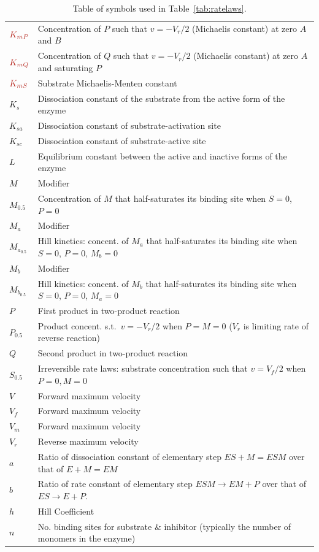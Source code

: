\documentclass[10pt]{cekarticle}
\newcommand{\changed}[1]{\textcolor{BrickRed}{#1}}
\begin{document}
\begin{table}[ht]
\begin{tabular}{lp{5.5in}}
    $\changed{K_{mP}}$	& Concentration of $P$ such that $v = -V_r/2$  (Michaelis constant) at zero $A$ and $B$ \\
    $\changed{K_{mQ}}$	& Concentration of $Q$ such that $v = -V_r/2$  (Michaelis constant) at zero $A$ and saturating $P$ \\
    $\changed{K_{mS}}$	& Substrate Michaelis-Menten constant \\
    $K_s$	& Dissociation constant of the substrate from the active form of the enzyme \\
    $K_{sa}$	& Dissociation constant of substrate-activation site \\
    $K_{sc}$	& Dissociation constant of substrate-active site \\
    $L$		& Equilibrium constant between the active and inactive forms of the enzyme \\
    $M$		& Modifier \\
    $M_{0.5}$	& Concentration of $M$ that half-saturates its binding site when $S = 0$, $P=0$ \\
    \changed{$M_a$}	& Modifier \\
    \changed{$M_{a_{0.5}}$} & Hill kinetics: concent. of $M_a$ that half-saturates its binding site when $S = 0$, $P=0$, $M_b=0$\\
    \changed{$M_b$}	& Modifier \\
    \changed{$M_{b_{0.5}}$} & Hill kinetics: concent. of $M_b$ that half-saturates its binding site when $S = 0$, $P=0$, $M_a=0$\\
    $P$		& First product in two-product reaction \\
    \changed{$P_{0.5}$}	& Product concent. s.t.\ $v = - V_r/2$ when $P = M = 0$ ($V_r$ is limiting rate of reverse reaction) \\
    $Q$		& Second product in two-product reaction \\
    \changed{$S_{0.5}$}	& Irreversible rate laws: substrate concentration such that $v = V_f/2$ when $P = 0, M=0$ \\
    $V$		& Forward maximum velocity \\
    $V_f$	& Forward maximum velocity \\
    $V_m$	& Forward maximum velocity \\
    $V_r$	& Reverse maximum velocity \\
    $a$		& Ratio of dissociation constant of elementary step $ES + M = ESM$ over that of $E + M = EM$ \\
    $b$		& Ratio of rate constant of elementary step $ESM \to EM + P$ over that of $ES \to E + P$. \\
    $h$		& Hill Coefficient \\
    $n$		& No. binding sites for substrate \& inhibitor (typically the number of monomers in the enzyme) \\
    \bottomrule
  \end{tabular}
  \caption{Table of symbols used in Table~\ref{tab:ratelaws}.}
\end{table}
\end{document}
